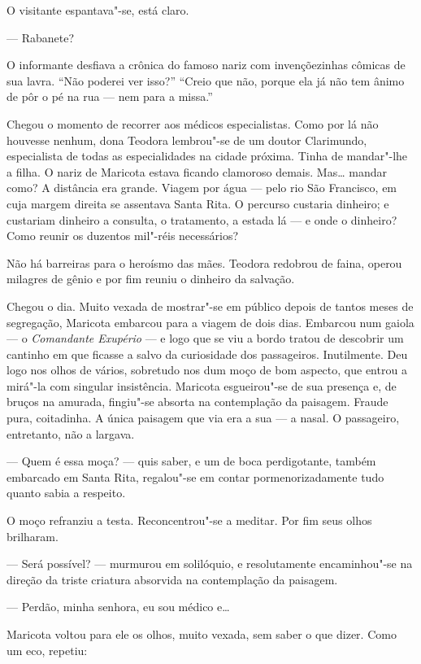 O visitante espantava"-se, está claro.

--- Rabanete?

O informante desfiava a crônica do famoso nariz com invençõezinhas
cômicas de sua lavra. ``Não poderei ver isso?'' ``Creio que não, porque
ela já não tem ânimo de pôr o pé na rua --- nem para a missa.''

Chegou o momento de recorrer aos médicos especialistas. Como por lá não
houvesse nenhum, dona Teodora lembrou"-se de um doutor Clarimundo,
especialista de todas as especialidades na cidade próxima. Tinha de
mandar"-lhe a filha. O nariz de Maricota estava ficando clamoroso demais.
Mas\ldots{} mandar como? A distância era grande. Viagem por água --- pelo rio
São Francisco, em cuja margem direita se assentava Santa Rita. O
percurso custaria dinheiro; e custariam dinheiro a consulta, o
tratamento, a estada lá --- e onde o dinheiro? Como reunir os duzentos
mil"-réis necessários?

Não há barreiras para o heroísmo das mães. Teodora redobrou de faina,
operou milagres de gênio e por fim reuniu o dinheiro da salvação.

Chegou o dia. Muito vexada de mostrar"-se em público depois de tantos
meses de segregação, Maricota embarcou para a viagem de dois dias.
Embarcou num gaiola --- o \emph{Comandante Exupério} --- e logo que se
viu a bordo tratou de descobrir um cantinho em que ficasse a salvo da
curiosidade dos passageiros. Inutilmente. Deu logo nos olhos de vários,
sobretudo nos dum moço de bom aspecto, que entrou a mirá"-la com singular
insistência. Maricota esgueirou"-se de sua presença e, de bruços na
amurada, fingiu"-se absorta na contemplação da paisagem. Fraude pura,
coitadinha. A única paisagem que via era a sua --- a nasal. O
passageiro, entretanto, não a largava.

--- Quem é essa moça? --- quis saber, e um de boca perdigotante, também
embarcado em Santa Rita, regalou"-se em contar pormenorizadamente tudo
quanto sabia a respeito.

O moço refranziu a testa. Reconcentrou"-se a meditar. Por fim seus olhos
brilharam.

--- Será possível? --- murmurou em solilóquio, e resolutamente
encaminhou"-se na direção da triste criatura absorvida na contemplação da
paisagem.

--- Perdão, minha senhora, eu sou médico e\ldots{}

Maricota voltou para ele os olhos, muito vexada, sem saber o que dizer.
Como um eco, repetiu:

